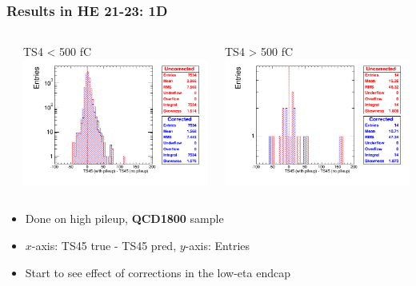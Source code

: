 \documentclass[bigger]{beamer}
\providecommand{\alert}[1]{\textbf{#1}}
\begin{document}
\begin{frame}
\frametitle{Results in HE 21-23: 1D}
\label{sec-3-3-12}
\begin{columns} %
\label{sec-3-3-12-1}
\begin{column}{0.55\textwidth}
\label{sec-3-3-12-1-1}

\centering
TS4 < 500 fC
\includegraphics[width=\textwidth]{fig/correction_comparison_1D_sample1800_under500_ring2.png}
\end{column}
\begin{column}{0.55\textwidth}
\label{sec-3-3-12-1-2}

\centering
TS4 > 500 fC
\includegraphics[width=\textwidth]{fig/correction_comparison_1D_sample1800_over500_ring2.png}
\end{column}
\end{columns}
\label{sec-3-3-12-2}
\begin{itemize}

\item Done on high pileup, \alert{QCD1800} sample
\label{sec-3-3-12-2-1}%

\item $x$-axis: TS45 true - TS45 pred, $y$-axis: Entries
\label{sec-3-3-12-2-2}%

\item Start to see effect of corrections in the low-eta endcap
\label{sec-3-3-12-2-3}%
\end{itemize} %
\end{frame}
\end{document}
